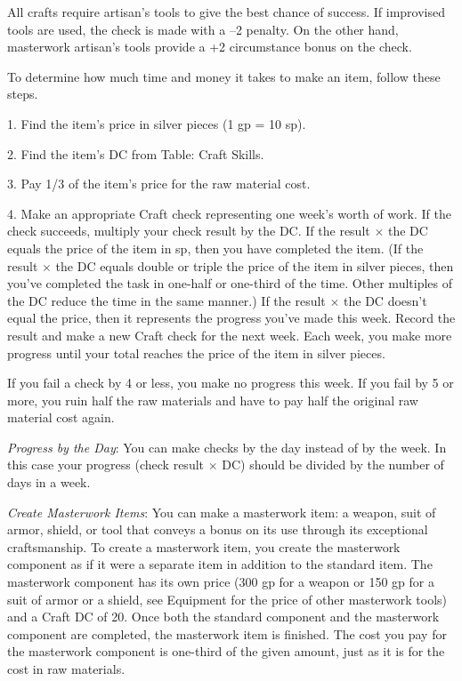 All crafts require artisan's tools to give the best chance of success. If improvised tools are used, the check is made with a --2 penalty. On the other hand, masterwork artisan's tools provide a +2 circumstance bonus on the check.
				
To determine how much time and money it takes to make an item, follow these steps.
				
1. Find the item's price in silver pieces (1 gp = 10 sp).
				
2. Find the item's DC from Table: Craft Skills.
				
3. Pay 1/3 of the item's price for the raw material cost.
				
4. Make an appropriate Craft check representing one week's worth of work. If the check succeeds, multiply your check result by the DC. If the result \mbox{$\times$} the DC equals the price of the item in sp, then you have completed the item. (If the result \mbox{$\times$} the DC equals double or triple the price of the item in silver pieces, then you've completed the task in one-half or one-third of the time. Other multiples of the DC reduce the time in the same manner.) If the result \mbox{$\times$} the DC doesn't equal the price, then it represents the progress you've made this week. Record the result and make a new Craft check for the next week. Each week, you make more progress until your total reaches the price of the item in silver pieces.
				
If you fail a check by 4 or less, you make no progress this week. If you fail by 5 or more, you ruin half the raw materials and have to pay half the original raw material cost again.
				
\textit{Progress by the Day}: You can make checks by the day instead of by the week. In this case your progress (check result \mbox{$\times$} DC) should be divided by the number of days in a week.
				
\textit{Create Masterwork Items}: You can make a masterwork item: a weapon, suit of armor, shield, or tool that conveys a bonus on its use through its exceptional craftsmanship. To create a masterwork item, you create the masterwork component as if it were a separate item in addition to the standard item. The masterwork component has its own price (300 gp for a weapon or 150 gp for a suit of armor or a shield, see Equipment for the price of other masterwork tools) and a Craft DC of 20. Once both the standard component and the masterwork component are completed, the masterwork item is finished. The cost you pay for the masterwork component is one-third of the given amount, just as it is for the cost in raw materials.
				

